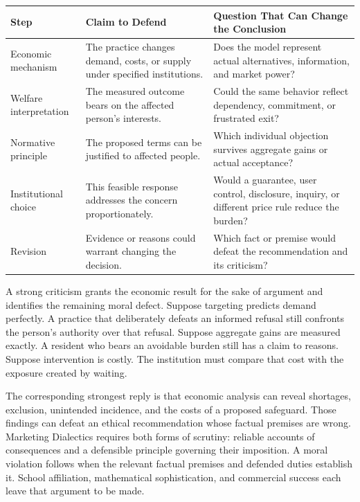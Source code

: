 \begin{table}[H]
\centering\small
\begin{tabular}{@{}
  >{\raggedright\arraybackslash}p{}
  >{\raggedright\arraybackslash}p{}
  >{\raggedright\arraybackslash}p{}@{}}
\toprule
Step & Claim to Defend & Question That Can Change the Conclusion \\
\midrule

Economic mechanism & The practice changes demand, costs, or supply under
specified institutions. & Does the model represent actual alternatives,
information, and market power? \\
Welfare interpretation & The measured outcome bears on the affected
person's interests. & Could the same behavior reflect dependency,
commitment, or frustrated exit? \\
Normative principle & The proposed terms can be justified to affected
people. & Which individual objection survives aggregate gains or actual
acceptance? \\
Institutional choice & This feasible response addresses the concern
proportionately. & Would a guarantee, user control, disclosure, inquiry,
or different price rule reduce the burden? \\
Revision & Evidence or reasons could warrant changing the decision. &
Which fact or premise would defeat the recommendation and its
criticism? \\
\bottomrule
\end{tabular}
\end{table}

A strong criticism grants the economic result for the sake of argument
and identifies the remaining moral defect. Suppose targeting predicts
demand perfectly. A practice that deliberately defeats an informed
refusal still confronts the person's authority over that refusal.
Suppose aggregate gains are measured exactly. A resident who bears an
avoidable burden still has a claim to reasons. Suppose intervention is
costly. The institution must compare that cost with the exposure created
by waiting.

The corresponding strongest reply is that economic analysis can reveal
shortages, exclusion, unintended incidence, and the costs of a proposed
safeguard. Those findings can defeat an ethical recommendation whose
factual premises are wrong. Marketing Dialectics requires both forms of
scrutiny: reliable accounts of consequences and a defensible principle
governing their imposition. A moral violation follows when the relevant
factual premises and defended duties establish it. School affiliation,
mathematical sophistication, and commercial success each leave that
argument to be made.


